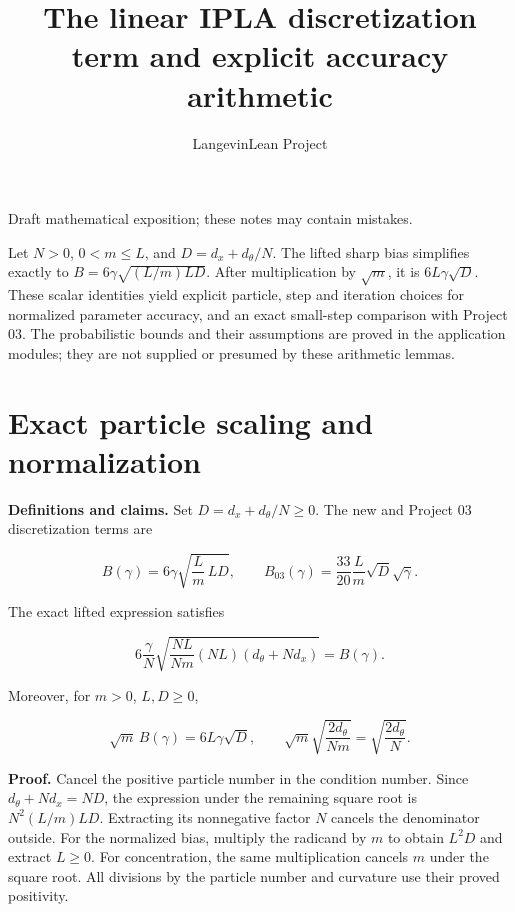 \documentclass[11pt,a4paper]{article}
\title{\texorpdfstring{The linear IPLA discretization term and explicit accuracy arithmetic}{The linear IPLA discretization term and explicit accuracy arithmetic}}
\author{LangevinLean Project}
\date{}
\begin{document}
\maketitle
Draft mathematical exposition; these notes may contain mistakes.


Let \(N>0\), \(0<m\le L\), and \(D=d_x+d_\theta/N\). The lifted sharp bias simplifies exactly to \(B=6\gamma\sqrt{(L/m)LD}\). After multiplication by \(\sqrt m\), it is \(6L\gamma\sqrt D\). These scalar identities yield explicit particle, step and iteration choices for normalized parameter accuracy, and an exact small-step comparison with Project 03. The probabilistic bounds and their assumptions are proved in the application modules; they are not supplied or presumed by these arithmetic lemmas.


\section{\texorpdfstring{Exact particle scaling and normalization}{Exact particle scaling and normalization}}


\textbf{Definitions and claims.} Set \(D=d_x+d_\theta/N\ge0\). The new and Project 03 discretization terms are

\[B(\gamma)=6\gamma\sqrt{\frac Lm\,LD},\qquad B_{03}(\gamma)=\frac{33}{20}\frac Lm\sqrt D\sqrt\gamma.\]


The exact lifted expression satisfies

\[6\frac\gamma N\sqrt{\frac{NL}{Nm}(NL)(d_\theta+Nd_x)}=B(\gamma).\]


Moreover, for \(m>0\), \(L,D\ge0\),

\[\sqrt m\,B(\gamma)=6L\gamma\sqrt D,\qquad \sqrt m\sqrt{\frac{2d_\theta}{Nm}}=\sqrt{\frac{2d_\theta}{N}}.\]


\textbf{Proof.} Cancel the positive particle number in the condition number. Since \(d_\theta+Nd_x=ND\), the expression under the remaining square root is \(N^2(L/m)LD\). Extracting its nonnegative factor \(N\) cancels the denominator outside. For the normalized bias, multiply the radicand by \(m\) to obtain \(L^2D\) and extract \(L\ge0\). For concentration, the same multiplication cancels \(m\) under the square root. All divisions by the particle number and curvature use their proved positivity.
\end{document}

